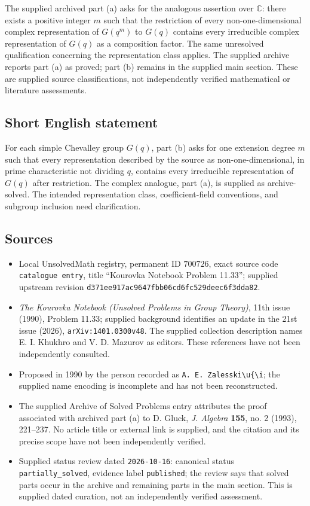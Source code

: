 \documentclass[11pt]{article}
\newcommand{\C}{\mathbb{C}}
\begin{document}
The supplied archived part (a) asks for the analogous assertion over \(\C\): there exists a positive integer \(m\) such that the restriction of every non-one-dimensional complex representation of \(G(q^m)\) to \(G(q)\) contains every irreducible complex representation of \(G(q)\) as a composition factor. The same unresolved qualification concerning the representation class applies. The supplied archive reports part (a) as proved; part (b) remains in the supplied main section. These are supplied source classifications, not independently verified mathematical or literature assessments.
\subsection{Short English statement}
For each simple Chevalley group \(G(q)\), part (b) asks for one extension degree \(m\) such that every representation described by the source as non-one-dimensional, in prime characteristic not dividing \(q\), contains every irreducible representation of \(G(q)\) after restriction. The complex analogue, part (a), is supplied as archive-solved. The intended representation class, coefficient-field conventions, and subgroup inclusion need clarification.
\subsection{Sources}
\begin{itemize}
\item Local UnsolvedMath registry, permanent ID \(700726\), exact source code \texttt{catalogue entry}, title ``Kourovka Notebook Problem 11.33''; supplied upstream revision \texttt{d371ee917ac9647fbb06cd6fc529deec6f3dda82}.
\item \emph{The Kourovka Notebook (Unsolved Problems in Group Theory)}, 11th issue (1990), Problem 11.33; supplied background identifies an update in the 21st issue (2026), \texttt{arXiv:1401.0300v48}. The supplied collection description names E. I. Khukhro and V. D. Mazurov as editors. These references have not been independently consulted.
\item Proposed in 1990 by the person recorded as \texttt{A. E. Zalesski\textbackslash u\{\textbackslash i}; the supplied name encoding is incomplete and has not been reconstructed.
\item The supplied Archive of Solved Problems entry attributes the proof associated with archived part (a) to D. Gluck, \emph{J. Algebra} \textbf{155}, no. 2 (1993), 221--237. No article title or external link is supplied, and the citation and its precise scope have not been independently verified.
\item Supplied status review dated \texttt{2026-10-16}: canonical status \texttt{partially\_solved}, evidence label \texttt{published}; the review says that solved parts occur in the archive and remaining parts in the main section. This is supplied dated curation, not an independently verified assessment.
\end{itemize}
\end{document}
